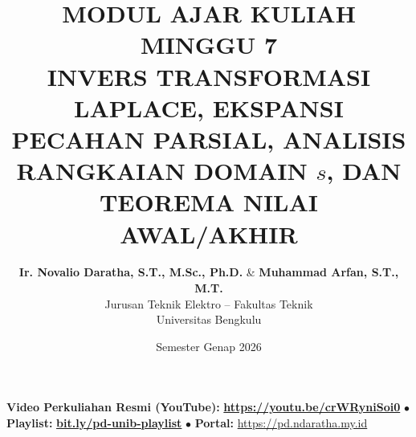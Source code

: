 \documentclass[11pt,a4paper]{article}
\title{\textbf{\Large MODUL AJAR KULIAH MINGGU 7}\\[0.3cm]
\textbf{\LARGE INVERS TRANSFORMASI LAPLACE, EKSPANSI PECAHAN PARSIAL, ANALISIS RANGKAIAN DOMAIN $s$, DAN TEOREMA NILAI AWAL/AKHIR}}
\author{\textbf{Ir. Novalio Daratha, S.T., M.Sc., Ph.D.} \& \textbf{Muhammad Arfan, S.T., M.T.} \\ 
Jurusan Teknik Elektro -- Fakultas Teknik \\ 
Universitas Bengkulu}
\date{Semester Genap 2026}
\theoremstyle{definition}
\begin{document}
\maketitle
\begin{center}
  \vspace{-0.25cm}
  \begin{tcolorbox}[colback=red!4!white,colframe=red!75!black,boxrule=0.5pt,arc=2pt,left=6pt,right=6pt,top=3pt,bottom=3pt,width=0.98\textwidth]
    \centering\footnotesize
    \textbf{Video Perkuliahan Resmi (YouTube):} {\color{red!80!black}\textbf{\url{https://youtu.be/crWRyniSoi0}}} \quad $\bullet$ \quad \textbf{Playlist:} \href{https://www.youtube.com/playlist?list=PLS5oOZWXZeTw}{\color{blue!80!black}\textbf{bit.ly/pd-unib-playlist}} \quad $\bullet$ \quad \textbf{Portal:} \url{https://pd.ndaratha.my.id}
  \end{tcolorbox}
  \vspace{-0.15cm}
\end{center}
\end{document}
